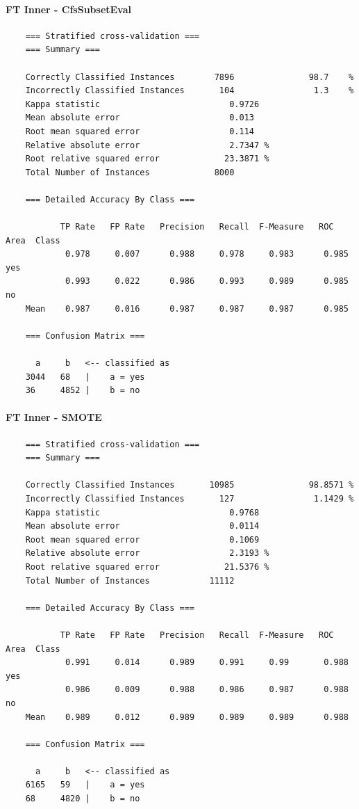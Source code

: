 \pagebreak
\paragraph{FT Inner - CfsSubsetEval}
{\scriptsize
	\begin{verbatim}
	=== Stratified cross-validation ===
	=== Summary ===
	
	Correctly Classified Instances        7896               98.7    %
	Incorrectly Classified Instances       104                1.3    %
	Kappa statistic                          0.9726
	Mean absolute error                      0.013 
	Root mean squared error                  0.114 
	Relative absolute error                  2.7347 %
	Root relative squared error             23.3871 %
	Total Number of Instances             8000     
	
	=== Detailed Accuracy By Class ===
	
	       TP Rate   FP Rate   Precision   Recall  F-Measure   ROC Area  Class
	        0.978     0.007      0.988     0.978     0.983      0.985    yes
	        0.993     0.022      0.986     0.993     0.989      0.985    no
	Mean    0.987     0.016      0.987     0.987     0.987      0.985
	
	=== Confusion Matrix ===
	
	  a     b   <-- classified as
	3044   68   |    a = yes
	36     4852 |    b = no	
	\end{verbatim}
}

\paragraph{FT Inner - SMOTE}
{\scriptsize
	\begin{verbatim}
	=== Stratified cross-validation ===
	=== Summary ===
	
	Correctly Classified Instances       10985               98.8571 %
	Incorrectly Classified Instances       127                1.1429 %
	Kappa statistic                          0.9768
	Mean absolute error                      0.0114
	Root mean squared error                  0.1069
	Relative absolute error                  2.3193 %
	Root relative squared error             21.5376 %
	Total Number of Instances            11112     
	
	=== Detailed Accuracy By Class ===
	
	       TP Rate   FP Rate   Precision   Recall  F-Measure   ROC Area  Class
	        0.991     0.014      0.989     0.991     0.99       0.988    yes
	        0.986     0.009      0.988     0.986     0.987      0.988    no
	Mean    0.989     0.012      0.989     0.989     0.989      0.988
	
	=== Confusion Matrix ===
	
	  a     b   <-- classified as
	6165   59   |    a = yes
	68     4820 |    b = no	
	\end{verbatim}
}

